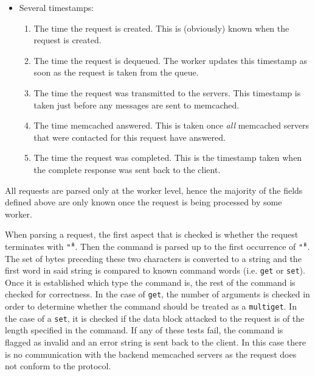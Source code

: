 \documentclass[11pt,a4paper]{article}
\begin{document}
\begin{itemize}
    \item Several timestamps:
    \begin{enumerate}
        \item The time the request is created. This is (obviously) known when the request is created.
        \item The time the request is dequeued. The worker updates this timestamp as soon as the request is taken from the queue.
        \item The time the request was transmitted to the servers. This timestamp is taken just before any messages are sent to memcached.
        \item The time memcached answered. This is taken once \textit{all} memcached servers that were contacted for this request have answered.
        \item The time the request was completed. This is the timestamp taken when the complete response was sent back to the client.
    \end{enumerate}
\end{itemize}

All requests are parsed only at the worker level, hence the majority of the fields defined above are only known once the request is being processed by some worker.

When parsing a request, the first aspect that is checked is whether the request terminates with \texttt{"\r\n"}. Then the command is parsed up to the first occurrence of \texttt{"\r\n"}. The set of bytes preceding these two characters is converted to a string and the first word in said string is compared to known command words (i.e. \texttt{get} or \texttt{set}). Once it is established which type the command is, the rest of the command is checked for correctness. In the case of \texttt{get}, the number of arguments is checked in order to determine whether the command should be treated as a \texttt{multiget}. In the case of a \texttt{set}, it is checked if the data block attacked to the request is of the length specified in the command. If any of these tests fail, the command is flagged as invalid and an error string is sent back to the client. In this case there is no communication with the backend memcached servers as the request does not conform to the protocol.
\end{document}
